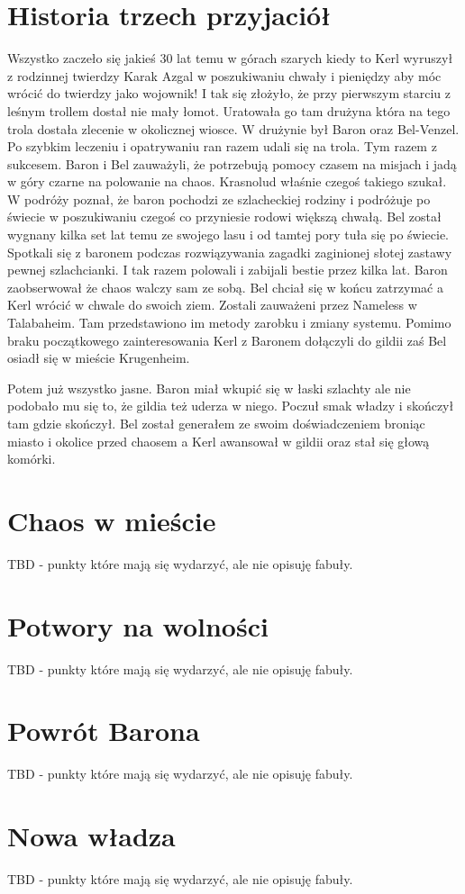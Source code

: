\documentclass{article}
\begin{document}
\section*{Historia trzech przyjaciół}
    Wszystko zaczeło się jakieś 30 lat temu w górach szarych kiedy to Kerl wyruszył z rodzinnej twierdzy Karak Azgal w poszukiwaniu chwały i pieniędzy aby móc wrócić do twierdzy jako wojownik! I tak się złożyło, że przy pierwszym starciu z leśnym trollem dostał nie mały łomot. Uratowała go tam drużyna która na tego trola dostała zlecenie w okolicznej wiosce. W drużynie był Baron oraz Bel-Venzel. Po szybkim leczeniu i opatrywaniu ran razem udali się na trola. Tym razem z sukcesem. Baron i Bel zauważyli, że potrzebują pomocy czasem na misjach i jadą w góry czarne na polowanie na chaos. Krasnolud właśnie czegoś takiego szukał. W podróży poznał, że baron pochodzi ze szlacheckiej rodziny i podróżuje po świecie w poszukiwaniu czegoś co przyniesie rodowi większą chwałą. Bel został wygnany kilka set lat temu ze swojego lasu i od tamtej pory tuła się po świecie. Spotkali się z baronem podczas rozwiązywania zagadki zaginionej słotej zastawy pewnej szlachcianki. I tak razem polowali i zabijali bestie przez kilka lat. Baron zaobserwował że chaos walczy sam ze sobą. Bel chciał się w końcu zatrzymać a Kerl wrócić w chwale do swoich ziem. Zostali zauważeni przez Nameless w Talabaheim. Tam przedstawiono im metody zarobku i zmiany systemu. Pomimo braku początkowego zainteresowania Kerl z Baronem dołączyli do gildii zaś Bel osiadł się w mieście Krugenheim.

    Potem już wszystko jasne. Baron miał wkupić się w łaski szlachty ale nie podobało mu się to, że gildia też uderza w niego. Poczuł smak władzy i skończył tam gdzie skończył. Bel został generałem ze swoim doświadczeniem broniąc miasto i okolice przed chaosem a Kerl awansował w gildii oraz stał się głową komórki. 

\section*{Chaos w mieście}

    TBD - punkty które mają się wydarzyć, ale nie opisuję fabuły.

\section*{Potwory na wolności}

    TBD - punkty które mają się wydarzyć, ale nie opisuję fabuły.

\section*{Powrót Barona}

    TBD - punkty które mają się wydarzyć, ale nie opisuję fabuły.

\section*{Nowa władza}

    TBD - punkty które mają się wydarzyć, ale nie opisuję fabuły.
\end{document}
